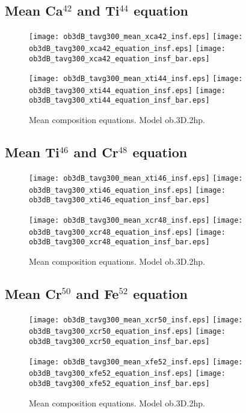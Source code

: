 \documentclass[10pt,paper=a4]{report}
\begin{document}
\newpage

\subsection{Mean Ca$^{42}$ and Ti$^{44}$ equation}

\begin{figure}[!h]
\centerline{
\texttt{[image: ob3dB\_tavg300\_mean\_xca42\_insf.eps]}
\texttt{[image: ob3dB\_tavg300\_xca42\_equation\_insf.eps]}
\texttt{[image: ob3dB\_tavg300\_xca42\_equation\_insf\_bar.eps]}}

\centerline{
\texttt{[image: ob3dB\_tavg300\_mean\_xti44\_insf.eps]}
\texttt{[image: ob3dB\_tavg300\_xti44\_equation\_insf.eps]}
\texttt{[image: ob3dB\_tavg300\_xti44\_equation\_insf\_bar.eps]}}
\caption{Mean composition equations. Model {\sf ob.3D.2hp}. \label{fig:xca40-ca42-equations}}
\end{figure}

\newpage

\subsection{Mean Ti$^{46}$ and Cr$^{48}$ equation}

\begin{figure}[!h]
\centerline{
\texttt{[image: ob3dB\_tavg300\_mean\_xti46\_insf.eps]}
\texttt{[image: ob3dB\_tavg300\_xti46\_equation\_insf.eps]}
\texttt{[image: ob3dB\_tavg300\_xti46\_equation\_insf\_bar.eps]}}

\centerline{
\texttt{[image: ob3dB\_tavg300\_mean\_xcr48\_insf.eps]}
\texttt{[image: ob3dB\_tavg300\_xcr48\_equation\_insf.eps]}
\texttt{[image: ob3dB\_tavg300\_xcr48\_equation\_insf\_bar.eps]}}
\caption{Mean composition equations. Model {\sf ob.3D.2hp}. \label{fig:xti44-xti46-equations}}
\end{figure}

\newpage

\subsection{Mean Cr$^{50}$ and Fe$^{52}$ equation}

\begin{figure}[!h]
\centerline{
\texttt{[image: ob3dB\_tavg300\_mean\_xcr50\_insf.eps]}
\texttt{[image: ob3dB\_tavg300\_xcr50\_equation\_insf.eps]}
\texttt{[image: ob3dB\_tavg300\_xcr50\_equation\_insf\_bar.eps]}}

\centerline{
\texttt{[image: ob3dB\_tavg300\_mean\_xfe52\_insf.eps]}
\texttt{[image: ob3dB\_tavg300\_xfe52\_equation\_insf.eps]}
\texttt{[image: ob3dB\_tavg300\_xfe52\_equation\_insf\_bar.eps]}}
\caption{Mean composition equations. Model {\sf ob.3D.2hp}. \label{fig:xcr48-xcr50-equations}}
\end{figure}
\end{document}
